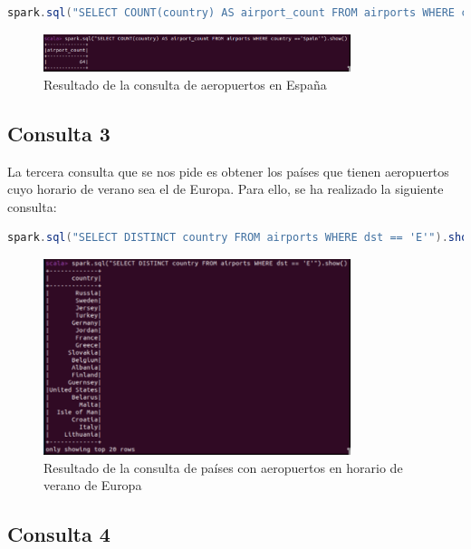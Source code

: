 \begin{lstlisting}[language=scala]
spark.sql("SELECT COUNT(country) AS airport_count FROM airports WHERE country == 'Spain'").show()
\end{lstlisting}

\begin{figure}[H]
    \centering
    \includegraphics[width=0.8\textwidth]{figures/61.png}
    \caption{Resultado de la consulta de aeropuertos en España}
    \label{fig:consulta2}
\end{figure}

\subsection{Consulta 3}

La tercera consulta que se nos pide es obtener los países que tienen aeropuertos cuyo horario de verano sea el de Europa. Para ello, se ha realizado la siguiente consulta:

\begin{lstlisting}[language=scala]
spark.sql("SELECT DISTINCT country FROM airports WHERE dst == 'E'").show()
\end{lstlisting}

\begin{figure}[H]
    \centering
    \includegraphics[width=0.8\textwidth]{figures/62.png}
    \caption{Resultado de la consulta de países con aeropuertos en horario de verano de Europa}
    \label{fig:consulta3}
\end{figure}

\subsection{Consulta 4}

